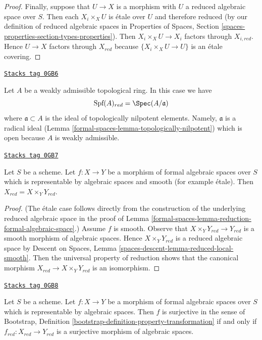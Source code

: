 \begin{proof}
\medskip\noindent
Finally, suppose that $U \to X$ is a morphism with
$U$ a reduced algebraic space over $S$. Then each $X_i \times_X U$
is \'etale over $U$ and therefore reduced (by our definition of
reduced algebraic spaces in Properties of Spaces, Section
\ref{spaces-properties-section-types-properties}).
Then $X_i \times_X U \to X_i$ factors through $X_{i, red}$.
Hence $U \to X$ factors through $X_{red}$ because
$\{X_i \times_X U \to U\}$ is an \'etale covering.
\end{proof}

\begin{example}
\label{formal-spaces-example-reduction-affine-formal-spectrum}
\href{https://stacks.math.columbia.edu/tag/0GB6}{\texttt{Stacks tag 0GB6}}

Let $A$ be a weakly admissible topological ring. In this case we have
$$
\text{Spf}(A)_{red} = \Spec(A/\mathfrak a)
$$
where $\mathfrak a \subset A$ is the ideal of topologically nilpotent
elements. Namely, $\mathfrak a$ is a radical ideal
(Lemma \ref{formal-spaces-lemma-topologically-nilpotent})
which is open because $A$ is weakly admissible.
\end{example}

\begin{lemma}
\label{formal-spaces-lemma-reduction-smooth}
\href{https://stacks.math.columbia.edu/tag/0GB7}{\texttt{Stacks tag 0GB7}}

Let $S$ be a scheme. Let $f : X \to Y$ be a morphism of
formal algebraic spaces over $S$ which is representable by
algebraic spaces and smooth (for example \'etale).
Then $X_{red} = X \times_Y Y_{red}$.
\end{lemma}

\begin{proof}
(The \'etale case follows directly from the construction of
the underlying reduced algebraic space in the proof of
Lemma \ref{formal-spaces-lemma-reduction-formal-algebraic-space}.)
Assume $f$ is smooth. Observe that $X \times_Y Y_{red} \to Y_{red}$
is a smooth morphism of algebraic spaces. Hence $X \times_Y Y_{red}$
is a reduced algebraic space by Descent on Spaces, Lemma
\ref{spaces-descent-lemma-reduced-local-smooth}.
Then the universal property of reduction shows that the canonical morphism
$X_{red} \to X \times_Y Y_{red}$ is an isomorphism.
\end{proof}

\begin{lemma}
\label{formal-spaces-lemma-reduction-surjective}
\href{https://stacks.math.columbia.edu/tag/0GB8}{\texttt{Stacks tag 0GB8}}

Let $S$ be a scheme. Let $f : X \to Y$ be a morphism of
formal algebraic spaces over $S$ which is representable by
algebraic spaces. Then $f$ is surjective in the sense of
Bootstrap, Definition \ref{bootstrap-definition-property-transformation}
if and only if $f_{red} : X_{red} \to Y_{red}$ is a
surjective morphism of algebraic spaces.
\end{lemma}

